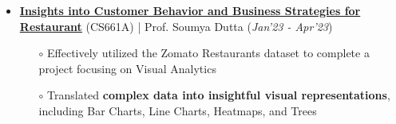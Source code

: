 \documentclass[10.8pt, a4paper]{extarticle}
\begin{document}
\begin{itemize}
  \vspace{0.055cm}
  \item \href{https://github.com/Vinay-Agrawal29/CS661_bizviz} {\textbf{Insights into Customer Behavior and Business Strategies for Restaurant}} (CS661A) | Prof. Soumya Dutta  \hfill\hfill(\textit{Jan'23 - Apr'23})
  \begin{itemize}
    \item[$\circ$] Effectively utilized the Zomato Restaurants dataset to complete a project focusing on Visual Analytics\\[-0.6cm]
    \item[$\circ$] Translated \textbf{complex data into insightful visual representations}, including Bar Charts, Line Charts, Heatmaps, and Trees \\[-0.6cm]
  \end{itemize}
  \vspace{0.055cm}

\end{itemize}
\end{document}
